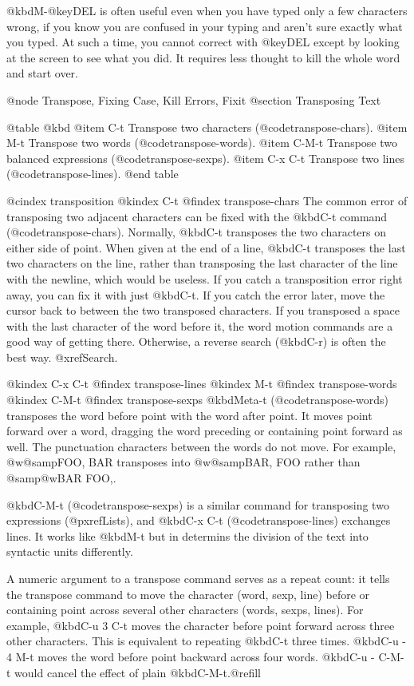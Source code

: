 {{{{{{{{{{{{{{{{  @kbd{M-@key{DEL}} is often useful even when you have typed only a few
characters wrong, if you know you are confused in your typing and aren't
sure exactly what you typed.  At such a time, you cannot correct with
@key{DEL} except by looking at the screen to see what you did.  It requires
less thought to kill the whole word and start over.

@node Transpose, Fixing Case, Kill Errors, Fixit
@section Transposing Text

@table @kbd
@item C-t
Transpose two characters (@code{transpose-chars}).
@item M-t
Transpose two words (@code{transpose-words}).
@item C-M-t
Transpose two balanced expressions (@code{transpose-sexps}).
@item C-x C-t
Transpose two lines (@code{transpose-lines}).
@end table

@cindex transposition
@kindex C-t
@findex transpose-chars
  The common error of transposing two adjacent characters can be fixed
with the @kbd{C-t} command (@code{transpose-chars}).  Normally,
@kbd{C-t} transposes the two characters on either side of point.  When
given at the end of a line, @kbd{C-t} transposes the last two characters
on the line, rather than transposing the last character of the line with
the newline, which would be useless.  If you catch a
transposition error right away, you can fix it with just @kbd{C-t}.
If you catch the error later,  move the cursor back to between
the two transposed characters.  If you transposed a space with the last
character of the word before it, the word motion commands are a good way
of getting there.  Otherwise, a reverse search (@kbd{C-r}) is often the
best way.  @xref{Search}.

@kindex C-x C-t
@findex transpose-lines
@kindex M-t
@findex transpose-words
@kindex C-M-t
@findex transpose-sexps
  @kbd{Meta-t} (@code{transpose-words}) transposes the word before point
with the word after point.  It moves point forward over a word, dragging
the word preceding or containing point forward as well.  The punctuation
characters between the words do not move.  For example, @w{@samp{FOO, BAR}}
transposes into @w{@samp{BAR, FOO}} rather than @samp{@w{BAR FOO,}}.

  @kbd{C-M-t} (@code{transpose-sexps}) is a similar command for transposing
two expressions (@pxref{Lists}), and @kbd{C-x C-t} (@code{transpose-lines})
exchanges lines.  It works like @kbd{M-t} but in determins the
division of the text into syntactic units differently.

  A numeric argument to a transpose command serves as a repeat count: it
tells the transpose command to move the character (word, sexp, line) before
or containing point across several other characters (words, sexps, lines).
For example, @kbd{C-u 3 C-t} moves the character before point forward
across three other characters.  This is equivalent to repeating @kbd{C-t}
three times.  @kbd{C-u - 4 M-t} moves the word before point backward across
four words.  @kbd{C-u - C-M-t} would cancel the effect of plain
@kbd{C-M-t}.@refill

}}}}}}}}}}}}}}}}
